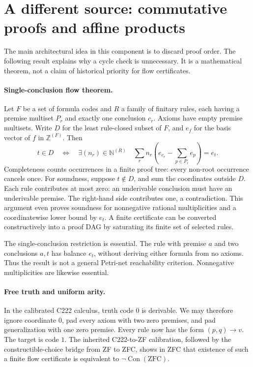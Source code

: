 \section{A different source: commutative proofs and affine products}
\label{sec:commutative}
The main architectural idea in this component is to discard proof order.
The following result explains why a cycle check is unnecessary. It is a
mathematical theorem, not a claim of historical priority for flow certificates.

\paragraph{Single-conclusion flow theorem.}
Let $F$ be a set of formula codes and $R$ a family of finitary rules, each
having a premise multiset $P_r$ and exactly one conclusion $c_r$. Axioms
have empty premise multisets. Write $D$ for the least rule-closed subset of
$F$, and $e_f$ for the basis vector of $f$ in $\mathbb Z^{(F)}$. Then
\[
 t\in D\quad\Longleftrightarrow\quad
 \exists(n_r)\in\mathbb N^{(R)}\quad
 \sum_r n_r\left(e_{c_r}-\sum_{p\in P_r}e_p\right)=e_t.
\]
Completeness counts occurrences in a finite proof tree: every non-root
occurrence cancels once. For soundness, suppose $t\notin D$, and sum the
coordinates outside $D$. Each rule contributes at most zero: an
underivable conclusion must have an underivable premise. The right-hand
side contributes one, a contradiction. This argument even proves soundness
for nonnegative rational multiplicities and a coordinatewise lower bound
by $e_t$. A finite certificate can be converted constructively into a
proof DAG by saturating its finite set of selected rules.

The single-conclusion restriction is essential. The rule with premise $a$
and two conclusions $a,t$ has balance $e_t$, without deriving either
formula from no axioms. Thus the result is not a general Petri-net
reachability criterion. Nonnegative multiplicities are likewise essential.

\paragraph{Free truth and uniform arity.}
In the calibrated C222 calculus, truth code $0$ is derivable. We may
therefore ignore coordinate $0$, pad every axiom with two zero premises,
and pad generalization with one zero premise. Every rule now has the form
$(p,q)\longrightarrow v$. The target is code $1$. The inherited C222-to-ZF
calibration, followed by the constructible-choice bridge from ZF to ZFC,
shows in ZFC that existence of such a finite flow certificate is equivalent
to $\neg\operatorname{Con}(\mathrm{ZFC})$.

